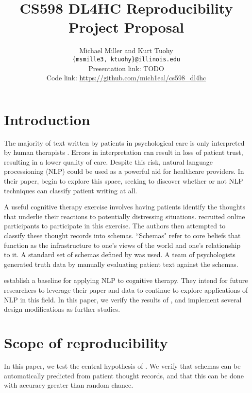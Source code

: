 \documentclass[11pt,a4paper]{article}
\title{CS598 DL4HC Reproducibility Project Proposal}
\author{Michael Miller and Kurt Tuohy \\
  \texttt{\{msmille3, ktuohy\}@illinois.edu}
  \\[2em]
  Presentation link: TODO\url{} \\
  Code link: \url{https://github.com/mich1eal/cs598_dl4hc}}
\begin{document}
\maketitle


\section{Introduction}

The majority of text written by patients in psychological care is only interpreted by human therapists \citep{burger_2021}. Errors in interpretation can result in loss of patient trust, resulting in a lower quality of care. Despite this risk, natural language processioning (NLP) could be used as a powerful aid for healthcare providers. In their paper, \citeauthor{burger_2021} begin to explore this space, seeking to discover whether or not NLP techniques can classify patient writing at all.

A useful cognitive therapy exercise involves having patients identify the thoughts that underlie their reactions to potentially distressing situations. \citeauthor{burger_2021} recruited online participants to participate in this exercise. The authors then attempted to classify these thought records into schemas. ``Schemas" refer to core beliefs that function as the infrastructure to one's views of the world and one's relationship to it. A standard set of schemas defined by \citeauthor{millings_2015} was used. A team of psychologists generated truth data by manually evaluating patient text against the schemas. 

\citeauthor{burger_2021} establish a baseline for applying NLP to cognitive therapy. They intend for future researchers to leverage their paper and data to continue to explore applications of NLP in this field. In this paper, we verify the results of \citeauthor{burger_2021}, and implement several design modifications as further studies. 

\section{Scope of reproducibility}

In this paper, we test the central hypothesis of \citeauthor{burger_2021}. We verify that schemas can be automatically predicted from patient thought records, and that this can be done with accuracy greater than random chance.
\end{document}

